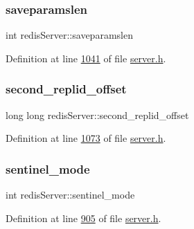 \subsubsection{\texorpdfstring{saveparamslen}{saveparamslen}}
{\footnotesize\ttfamily int redis\+Server\+::saveparamslen}



Definition at line \hyperlink{server_8h_source_l01041}{1041} of file \hyperlink{server_8h_source}{server.\+h}.

\mbox{\label{structredisServer_aafa26a3dfc41127af74ddf34b4a518eb}} 
\subsubsection{\texorpdfstring{second\+\_\+replid\+\_\+offset}{second\_replid\_offset}}
{\footnotesize\ttfamily long long redis\+Server\+::second\+\_\+replid\+\_\+offset}



Definition at line \hyperlink{server_8h_source_l01073}{1073} of file \hyperlink{server_8h_source}{server.\+h}.

\mbox{\label{structredisServer_a714f2a895d7f8e74bd17071d3e8251bf}} 
\subsubsection{\texorpdfstring{sentinel\+\_\+mode}{sentinel\_mode}}
{\footnotesize\ttfamily int redis\+Server\+::sentinel\+\_\+mode}



Definition at line \hyperlink{server_8h_source_l00905}{905} of file \hyperlink{server_8h_source}{server.\+h}.

\mbox{\label{structredisServer_a6969ac7939a6f5e0233b13f654f42f3f}} 

